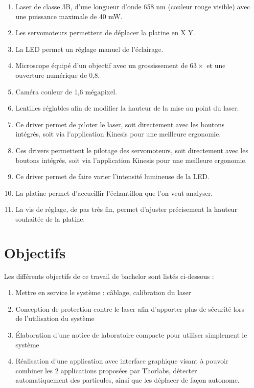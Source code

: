 \begin{enumerate}
    \item Laser de classe 3B, d'une longueur d'onde 658 nm (couleur rouge visible) avec une puissance maximale de 40 mW.
    \item Les servomoteurs permettent de déplacer la platine en X Y.
    \item La LED permet un réglage manuel de l'éclairage.
    \item Microscope équipé d'un objectif avec un grossissement de $63\times$ et une ouverture numérique de 0,8.
    \item Caméra couleur de 1,6 mégapixel.
    \item Lentilles réglables afin de modifier la hauteur de la mise au point du laser.
    \item Ce driver permet de piloter le laser, soit directement avec les boutons intégrés, soit via l'application Kinesis \cite{kinesisSoftware} pour une meilleure ergonomie.
    \item Ces drivers permettent le pilotage des servomoteurs, soit directement avec les boutons intégrés, soit via l'application Kinesis pour une meilleure ergonomie.
    \item Ce driver permet de faire varier l'intensité lumineuse de la LED.
    \item La platine permet d'accueillir l'échantillon que l'on veut analyser.
    \item La vis de réglage, de pas très fin, permet d'ajuster précisement la hauteur souhaitée de la platine.
\end{enumerate}

\section{Objectifs}

Les différents objectifs de ce travail de bachelor sont listés ci-dessous :
\begin{enumerate}
    \item Mettre en service le système : câblage, calibration du laser
    \item Conception de protection contre le laser afin d'apporter plus de sécurité lors de l'utilisation du système
    \item Élaboration d'une notice de laboratoire compacte pour utiliser simplement le système
    \item Réalisation d'une application avec interface graphique visant à pouvoir combiner les 2 applications proposées par Thorlabs, détecter automatiquement des particules, ainsi que les déplacer de façon autonome.
\end{enumerate}

